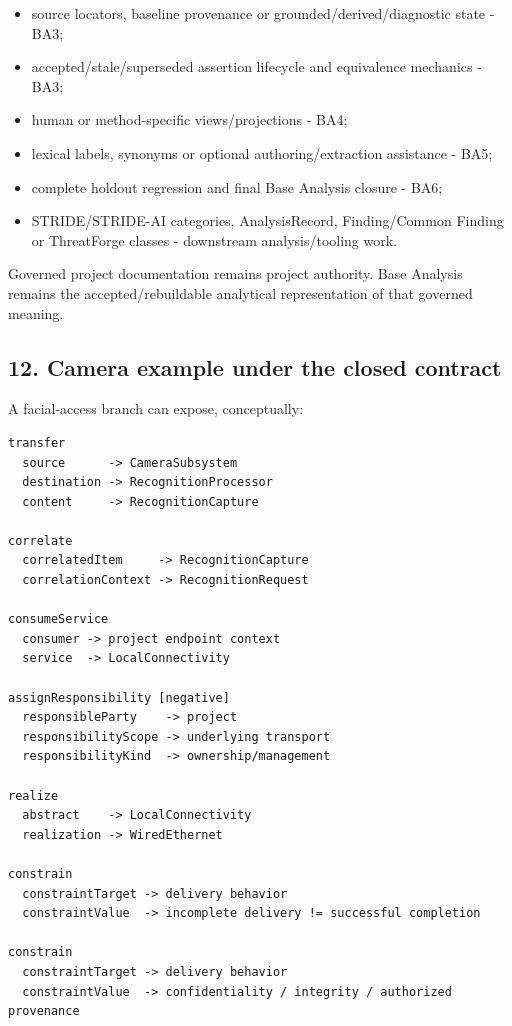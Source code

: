 \documentclass[11pt,a4paper]{article}
\providecommand{\tightlist}{\setlength{\itemsep}{0pt}\setlength{\parskip}{0pt}}
\begin{document}
\begin{itemize}
\tightlist
\item
  source locators, baseline provenance or grounded/derived/diagnostic state - BA3;
\item
  accepted/stale/superseded assertion lifecycle and equivalence mechanics - BA3;
\item
  human or method-specific views/projections - BA4;
\item
  lexical labels, synonyms or optional authoring/extraction assistance - BA5;
\item
  complete holdout regression and final Base Analysis closure - BA6;
\item
  STRIDE/STRIDE-AI categories, AnalysisRecord, Finding/Common Finding or ThreatForge classes - downstream analysis/tooling work.
\end{itemize}

Governed project documentation remains project authority. Base Analysis remains the accepted/rebuildable analytical representation of that governed meaning.

\subsection{12. Camera example under the closed contract}\label{camera-example-under-the-closed-contract}

A facial-access branch can expose, conceptually:

\begin{verbatim}
transfer
  source      -> CameraSubsystem
  destination -> RecognitionProcessor
  content     -> RecognitionCapture

correlate
  correlatedItem     -> RecognitionCapture
  correlationContext -> RecognitionRequest

consumeService
  consumer -> project endpoint context
  service  -> LocalConnectivity

assignResponsibility [negative]
  responsibleParty    -> project
  responsibilityScope -> underlying transport
  responsibilityKind  -> ownership/management

realize
  abstract    -> LocalConnectivity
  realization -> WiredEthernet

constrain
  constraintTarget -> delivery behavior
  constraintValue  -> incomplete delivery != successful completion

constrain
  constraintTarget -> delivery behavior
  constraintValue  -> confidentiality / integrity / authorized provenance
\end{verbatim}
\end{document}
